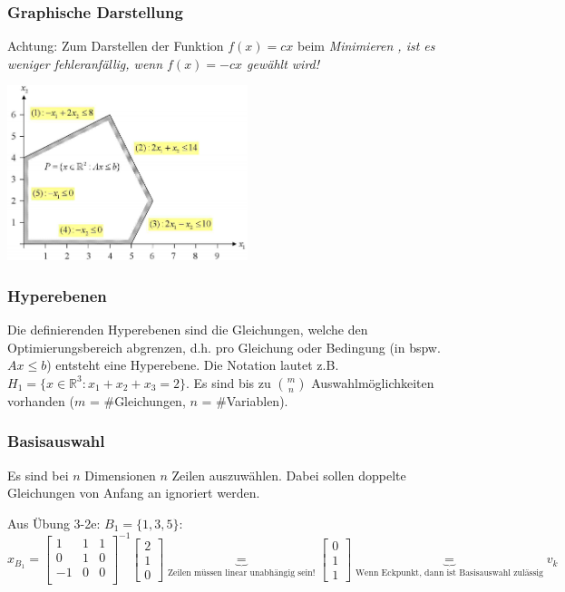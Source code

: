  	\subsubsection{Graphische Darstellung}
 	  Achtung: Zum Darstellen der Funktion $f(x) = cx$ beim \em Minimieren \em, ist es weniger fehleranfällig, wenn $f(x) = -cx$  gewählt wird!
 	  
 	  \includegraphics[width=7cm]{./Content/LinProg/Hyperplanes}
 	  
  \subsubsection{Hyperebenen}
    Die definierenden Hyperebenen sind die Gleichungen, welche den Optimierungsbereich abgrenzen, d.h. pro Gleichung oder Bedingung (in bspw. $Ax \leq b$) entsteht eine Hyperebene. Die Notation lautet z.B. $H_1 = \{x \in \mathbb{R}^3: x_1 + x_2 + x_3 = 2\}$. Es sind bis zu $\binom{m}{n}$ Auswahlmöglichkeiten vorhanden ($m$ = \#Gleichungen, $n$ = \#Variablen).
    
  \subsubsection{Basisauswahl}
    Es sind bei $n$ Dimensionen $n$ Zeilen auszuwählen. Dabei sollen doppelte Gleichungen von Anfang an ignoriert werden.
    
    Aus Übung 3-2e: $B_1 = \{1,3,5\}:$\\
    $x_{B_1} = \begin{bmatrix}
      1 & 1 & 1\\
      0 & 1 & 0\\
      -1 & 0 & 0\\
    \end{bmatrix}^{-1} \begin{bmatrix}
      2\\ 1 \\0
    \end{bmatrix} \underbrace{=}_{\text{Zeilen müssen linear unabhängig sein!}} \begin{bmatrix}
      0\\ 1 \\ 1
    \end{bmatrix} \underbrace{=}_{\text{Wenn Eckpunkt, dann ist Basisauswahl zulässig}} v_k$
    
